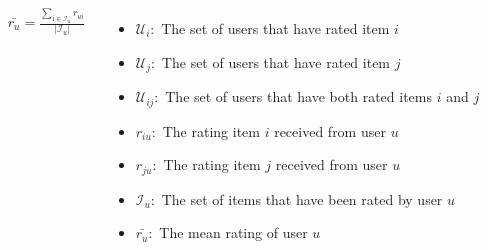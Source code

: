\begin{frame}
\begin{columns}
\begin{equation*}
\begin{split}
        &\bar{r_{u}} = \frac{\sum_{i \in \mathcal{I}_u}r_{ui}}
                            {\mathopen|\mathcal{I}_u\mathclose|}
        \end{split}
        \end{equation*}
        \tiny
        \begin{itemize}
            \item $\mathcal{U}_{i}:$ The set of users that have rated item $i$
            \item $\mathcal{U}_{j}:$ The set of users that have rated item $j$
            \item $\mathcal{U}_{ij}:$ The set of users that have both rated items $i$ and $j$
            \item $r_{iu}:$ The rating item $i$ received from user $u$
            \item $r_{ju}:$ The rating item $j$ received from user $u$
            \item $\mathcal{I}_{u}:$ The set of items that have been rated by user $u$
            \item $\bar{r_{u}}:$ The mean rating of user $u$
        \end{itemize}
    \end{columns}
\end{frame}
